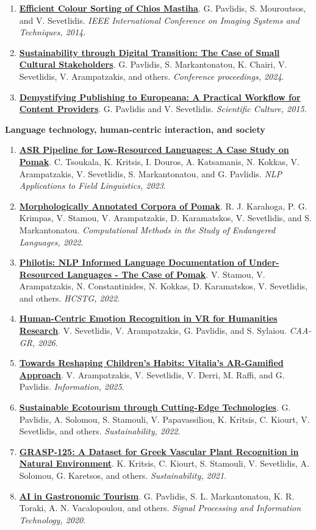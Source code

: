 \documentclass[11pt,a4paper]{article}
\newcommand{\paper}[4]{%
  \item \textbf{\href{#4}{#1}}. #2. \textit{#3}.
}
\begin{document}
\begin{enumerate}
  \paper{Efficient Colour Sorting of Chios Mastiha}{G. Pavlidis, S. Mouroutsos, and V. Sevetlidis}{IEEE International Conference on Imaging Systems and Techniques, 2014}{https://ieeexplore.ieee.org/abstract/document/6958510}
  \paper{Sustainability through Digital Transition: The Case of Small Cultural Stakeholders}{G. Pavlidis, S. Markantonatou, K. Chairi, V. Sevetlidis, V. Arampatzakis, and others}{Conference proceedings, 2024}{https://doi.org/10.12681/elrie.7138}
  \paper{Demystifying Publishing to Europeana: A Practical Workflow for Content Providers}{G. Pavlidis and V. Sevetlidis}{Scientific Culture, 2015}{https://www.sci-cult.com/demystifying-publishing-to-europeana-a-practical-workflow-for-content-providers/}
\end{enumerate}

\textbf{Language technology, human-centric interaction, and society}
\begin{enumerate}
  \paper{ASR Pipeline for Low-Resourced Languages: A Case Study on Pomak}{C. Tsoukala, K. Kritsis, I. Douros, A. Katsamanis, N. Kokkas, V. Arampatzakis, V. Sevetlidis, S. Markantonatou, and G. Pavlidis}{NLP Applications to Field Linguistics, 2023}{https://aclanthology.org/2023.fieldmatters-1.5/}
  \paper{Morphologically Annotated Corpora of Pomak}{R. J. Karahoga, P. G. Krimpas, V. Stamou, V. Arampatzakis, D. Karamatskos, V. Sevetlidis, and S. Markantonatou}{Computational Methods in the Study of Endangered Languages, 2022}{https://aclanthology.org/2022.computel-1.22/}
  \paper{Philotis: NLP Informed Language Documentation of Under-Resourced Languages - The Case of Pomak}{V. Stamou, V. Arampatzakis, N. Constantinides, N. Kokkas, D. Karamatskos, V. Sevetlidis, and others}{HCSTG, 2022}{https://doi.org/10.5281/zenodo.7598116}
  \paper{Human-Centric Emotion Recognition in VR for Humanities Research}{V. Sevetlidis, V. Arampatzakis, G. Pavlidis, and S. Sylaiou}{CAA-GR, 2026}{https://doi.org/10.1007/978-3-032-06389-2_21}
  \paper{Towards Reshaping Children's Habits: Vitalia's AR-Gamified Approach}{V. Arampatzakis, V. Sevetlidis, V. Derri, M. Raffi, and G. Pavlidis}{Information, 2025}{https://doi.org/10.3390/info16070606}
  \paper{Sustainable Ecotourism through Cutting-Edge Technologies}{G. Pavlidis, A. Solomou, S. Stamouli, V. Papavassiliou, K. Kritsis, C. Kiourt, V. Sevetlidis, and others}{Sustainability, 2022}{https://doi.org/10.3390/su14020800}
  \paper{GRASP-125: A Dataset for Greek Vascular Plant Recognition in Natural Environment}{K. Kritsis, C. Kiourt, S. Stamouli, V. Sevetlidis, A. Solomou, G. Karetsos, and others}{Sustainability, 2021}{https://doi.org/10.3390/su132111865}
  \paper{AI in Gastronomic Tourism}{G. Pavlidis, S. L. Markantonatou, K. R. Toraki, A. N. Vacalopoulou, and others}{Signal Processing and Information Technology, 2020}{https://doi.org/10.5281/zenodo.3862543}
\end{enumerate}
\end{document}
